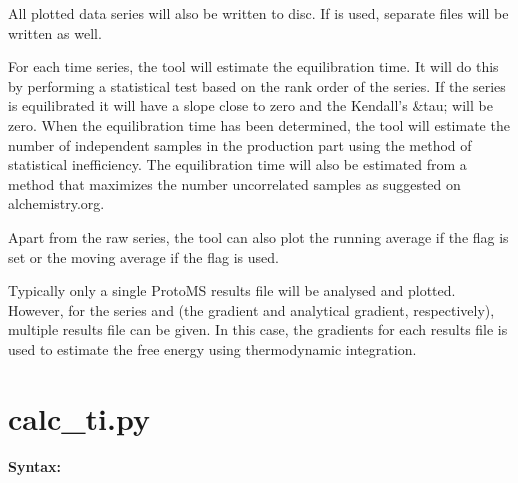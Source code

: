 \documentclass[letterpaper,10pt,english]{manual}
\begin{document}
All plotted data series will also be written to disc. If  is used, separate files will be written as well.

For each time series, the tool will estimate the equilibration time. It will do this by performing a statistical test based on the rank order of the series. If the series is equilibrated it will have a slope close to zero and the Kendall's \&tau; will be zero. When the equilibration time has been determined, the tool will estimate the number of independent samples in the production part using the method of statistical inefficiency. The equilibration time will also be estimated from a method that maximizes the number uncorrelated samples as suggested on alchemistry.org.

Apart from the raw series, the tool can also plot the running average if the  flag is set or the moving average if the  flag is used.

Typically only a single ProtoMS results file will be analysed and plotted. However, for the series  and  (the gradient and analytical gradient, respectively), multiple results file can be given. In this case, the gradients for each results file is used to estimate the free energy using thermodynamic integration.


\section{calc\_ti.py}

\textbf{Syntax:}
\end{document}
